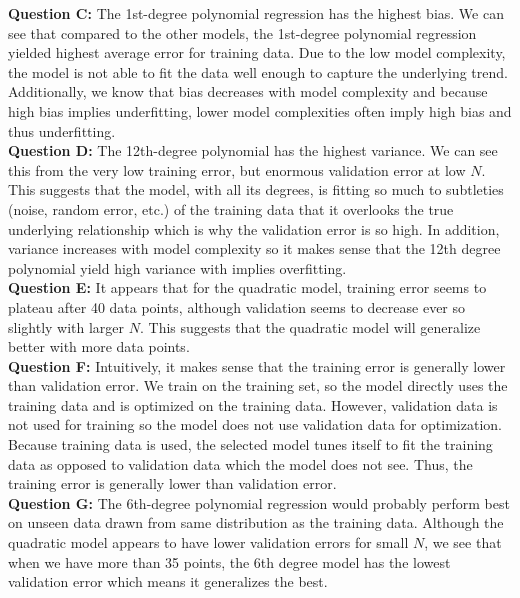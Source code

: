 \documentclass[12 pt]{article}
\begin{document}
	\noindent\textbf{Question C:} The 1st-degree polynomial regression has the highest bias. We can see that compared to the other models, the 1st-degree polynomial regression yielded highest average error for training data. Due to the low model complexity, the model is not able to fit the data well enough to capture the underlying trend. Additionally, we know that bias decreases with model complexity and because high bias implies underfitting, lower model complexities often imply high bias and thus underfitting.  \\
	
	\noindent\textbf{Question D:} The 12th-degree polynomial has the highest variance. We can see this from the very low training error, but enormous validation error at low $N$. This suggests that the model, with all its degrees, is fitting so much to subtleties (noise, random error, etc.) of the training data that it overlooks the true underlying relationship which is why the validation error is so high. In addition, variance increases with model complexity so it makes sense that the 12th degree polynomial yield high variance with implies overfitting.\\
	
	\noindent\textbf{Question E:} It appears that for the quadratic model, training error seems to plateau after 40 data points, although validation seems to decrease ever so slightly with larger $N$. This suggests that the quadratic model will generalize better with more data points. \\
	
	\noindent\textbf{Question F:} Intuitively, it makes sense that the training error is generally lower than validation error. We train on the training set, so the model directly uses the training data and is optimized on the training data. However, validation data is not used for training so the model does not use validation data for optimization. Because training data is used, the selected model tunes itself to fit the training data as opposed to validation data which the model does not see. Thus, the training error is generally lower than validation error. \\
	
	\noindent\textbf{Question G:} The 6th-degree polynomial regression would probably perform best on unseen data drawn from same distribution as the training data. Although the quadratic model appears to have lower validation errors for small $N$, we see that when we have more than 35 points, the 6th degree model has the lowest validation error which means it generalizes the best. 
	
\end{document}

